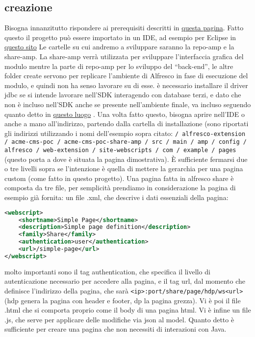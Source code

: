 \subsection{creazione}
Bisogna innanzitutto rispondere ai prerequisiti descritti in  \href{http://docs.alfresco.com/sdk2.1/concepts/alfresco-sdk-installing-prerequisite-software.html}{questa pagina}.
Fatto questo il progetto può essere importato in un IDE, ad esempio per Eclipse in \href{http://docs.alfresco.com/sdk2.1/concepts/alfresco-sdk-rad.html}{questo sito}
Le cartelle su cui andremo a sviluppare saranno la repo-amp e la share-amp. La share-amp verrà utilizzata per sviluppare l’interfaccia grafica del modulo mentre la parte di repo-amp  per lo sviluppo del “back-end”, le altre folder create servono per replicare l’ambiente di Alfresco in fase di esecuzione del modulo, e quindi non ha senso lavorare su di esse.
è necessario installare il driver jdbc se si intende  lavorare nell’SDK interagendo con database terzi, e dato che non è incluso nell'SDK anche se presente nell'ambiente finale, va incluso seguendo quanto detto in  \href{https://community.alfresco.com/thread/213317-sdk-21-including-third-party-jar-libraries}{questo luogo} . 
Una volta fatto questo, bisogna aprire nell’IDE o anche a mano all’indirizzo, partendo dalla cartella di installazione (sono riportati gli indirizzi utilizzando i nomi dell’esempio sopra citato: \texttt{/ alfresco-extension / acme-cms-poc / acme-cms-poc-share-amp / src / main / amp / config / alfresco / web-extension / site-webscripts / com / example / pages}
 (questo porta a dove è situata la pagina dimostrativa). È sufficiente fermarsi due o tre livelli sopra se l’intenzione è quella di mettere la gerarchia per una pagina custom (come fatto in questo progetto).
Una pagina fatta in alfresco share è composta da tre file, per semplicità prendiamo in considerazione la pagina di esempio già fornita:
un file .xml, che descrive i dati essenziali della pagina:
\begin{lstlisting}[language=XML]
<webscript>
    <shortname>Simple Page</shortname>
    <description>Simple page definition</description>
    <family>Share</family>
    <authentication>user</authentication>
    <url>/simple-page</url>
</webscript>
\end{lstlisting}
molto importanti sono il tag authentication, che specifica il livello di autenticazione necessario per accedere alla pagina, e il tag url, dal momento che definisce l’indirizzo della pagina, che sarà \texttt{<ip>:port/share/page/hdp/ws<url>} (hdp genera la pagina con header e footer, dp la pagina grezza).
Vi è poi il file .html che si comporta proprio come il body di una pagina html.
Vi è infine un file .js, che serve per applicare delle modifiche via json al model.
Quanto detto è sufficiente per creare una pagina che non necessiti di interazioni con Java.

